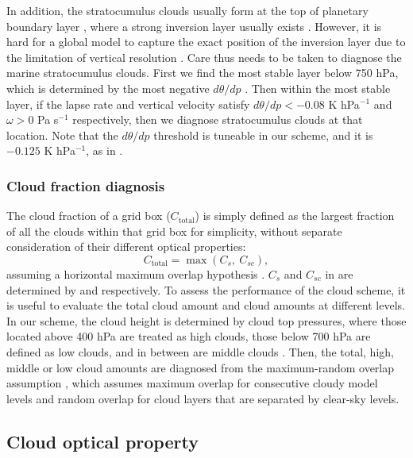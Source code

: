 In addition, the stratocumulus clouds usually form at the top of planetary boundary layer \citep{Wood2012}, where a strong inversion layer usually exists \citep{Wood2006,Park2019}. However, it is hard for a global model to capture the exact position of the inversion layer due to the limitation of vertical resolution \citep{Kawai2019}. Care thus needs to be taken to diagnose the marine stratocumulus clouds. First we find the most stable layer below 750 hPa, which is determined by the most negative $d\theta/dp$ \citep{Slingo1987}. Then within the most stable layer, if the lapse rate and vertical velocity satisfy $d\theta/dp<-0.08$ K hPa$^{-1}$ and $\omega>0$ Pa s$^{-1}$ respectively, then we diagnose stratocumulus clouds at that location. Note that the $d\theta/dp$ threshold is tuneable in our scheme, and it is $-0.125$ K hPa$^{-1}$, as in \citet{Collins2004}.

\subsubsection{Cloud fraction diagnosis}
\label{sec:cld_amt_diag}

The cloud fraction of a grid box ($C_\mathrm{total}$) is simply defined as the largest fraction of all the clouds within that grid box for simplicity, without separate consideration of their different optical properties:
\begin{equation}
	C_\mathrm{total}=\max(C_s, ~C_{sc}),
	\label{eq:CF_total}
\end{equation}
assuming a horizontal maximum overlap hypothesis \citep[e.g.,][]{Collins2004, Roehrig2020}. $C_s$ and $C_{sc}$ in  are determined by  and  respectively. To assess the performance of the cloud scheme, it is useful to evaluate the total cloud amount and cloud amounts at different levels. In our scheme, the cloud height is determined by cloud top pressures, where those located above 400 hPa are treated as high clouds, those below 700 hPa are defined as low clouds, and in between are middle clouds \citep{Collins2004}. Then, the total, high, middle or low cloud amounts are diagnosed from the maximum-random overlap assumption \citep{Morcrette2000}, which assumes maximum overlap for consecutive cloudy model levels and random overlap for cloud layers that are separated by clear-sky levels.

\subsection{Cloud optical property}
\label{sec:cld_optical_property}

